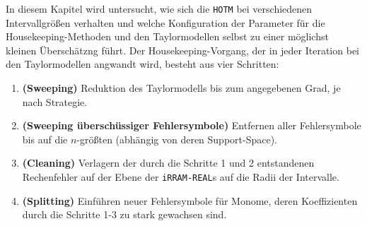 In diesem Kapitel wird untersucht, wie sich die \verb+HOTM+ bei verschiedenen Intervallgrößen verhalten und welche Konfiguration der Parameter für die Housekeeping-Methoden und den Taylormodellen selbst zu einer möglichst kleinen Überschätzng führt.
Der Housekeeping-Vorgang, der in jeder Iteration bei den Taylormodellen angwandt wird, besteht aus vier Schritten:
 \begin{enumerate}
  \item \textbf{(Sweeping)} Reduktion des Taylormodells bis zum angegebenen Grad, je nach Strategie.
  \item \textbf{(Sweeping überschüssiger Fehlersymbole)} Entfernen aller Fehlersymbole bis auf die $n$-größten (abhängig von deren Support-Space).
  \item \textbf{(Cleaning)} Verlagern der durch die Schritte 1 und 2 entstandenen Rechenfehler auf der Ebene der \verb+iRRAM-REAL+s auf die Radii der Intervalle.
  \item \textbf{(Splitting)} Einführen neuer Fehlersymbole für Monome, deren Koeffizienten durch die Schritte 1-3 zu stark gewachsen sind.
 \end{enumerate}

% 
% 




